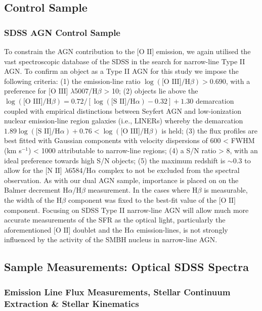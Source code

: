 \subsection{Control Sample}

\subsubsection{SDSS AGN Control Sample}

To constrain the AGN contribution to the $\text{[O II]}$ emission, we again utilised the vast spectroscopic database of the SDSS in the search for narrow-line Type II AGN. To confirm an object as a Type II AGN for this study we impose the following criteria: (1) the emission-line ratio $\log(\text{[O III]}/\text{H}\beta)>{0.690}$, with a preference for $\text{[O III]}$ $\lambda$5007/$\text{H}\beta$ > 10; (2) objects lie above the ${\log{(\text{[O III]}/\text{H}\beta)}}=0.72/[{\log{(\text{[S II]}/\text{H}\alpha)}}-0.32]+1.30$ demarcation coupled with empirical distinctions between Seyfert AGN and low-ionization nuclear emission-line region galaxies (i.e., LINERs) whereby the demarcation ${1.89\log{(\text{[S II]}/\text{H}\alpha)}+0.76}<{\log{(\text{[O III]}/\text{H}\beta)}}$ is held; (3) the flux profiles are best fitted with Gaussian components with velocity dispersions of 600 < FWHM (km s$^{-1}$) < 1000 attributable to narrow-line regions; (4) a S/N ratio > 8, with an ideal preference towards high S/N objects; (5) the maximum redshift is $\sim{0.3}$ to allow for the $\text{[N II]}$ $\lambda$6584/$\text{H}\alpha$ complex to not be excluded from the spectral observation. As with our dual AGN sample, importance is placed on on the Balmer decrement $\text{H}\alpha$/$\text{H}\beta$ measurement. In the cases where $\text{H}\beta$ is measurable, the width of the $\text{H}\beta$ component was fixed to the best-fit value of the $\text{[O II]}$ component. Focusing on SDSS Type II narrow-line AGN will allow much more accurate measurements of the SFR as the optical light, particularly the aforementioned $\text{[O II]}$ doublet and the $\text{H}\alpha$ emission-lines, is not strongly influenced by the activity of the SMBH nucleus in narrow-line AGN.

\subsection{Sample Measurements: Optical SDSS Spectra}

\subsubsection{Emission Line Flux Measurements, Stellar Continuum Extraction \& Stellar Kinematics}

